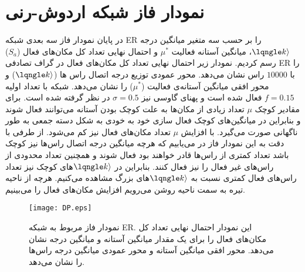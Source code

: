 \section{نمودار فاز شبکه اردوش-رنی}
در پایان نمودار فاز  سه بعدی شبکه ER  را بر حسب سه متغیر میانگین درجه $\lqngle k \rangle$، میانگین آستانه فعالیت  $\mu^*$ و احتمال نهایی تعداد کل مکان‌های فعال ($S_{a}$) رسم کردیم. نمودار زیر احتمال  نهایی تعداد کل مکان‌های فعال در گراف تصادفی ER را با $10000$ راس نشان می‌دهد. محور عمودی توزیع  درجه اتصال‌ راس ها ($\lqngle k \rangle$) و محور افقی میانگین آستانه‌ی فعالیت  ($\mu^*$) را نشان می‌دهد. شبکه با تعداد اولیه $f = 0.15$ فعال شده است و پهنای گاوسی نیز $\sigma = 0.5$ در نظر گرفته شده است. برای مقادیر کوچک $\mu$ تعداد زیادی از مکان‌ها به علت کوچک بودن آستانه می‌توانند فعال شوند و بنابراین در میانگین‌های کوچک فعال سازی خود به خودی به شکل دسته جمعی به طور ناگهانی صورت می‌گیرد. با افزایش $\mu$  تعداد مکان‌های فعال نیز کم می‌شود. از طرفی با دقت به این نمودار فاز در می‌یابیم که هرچه میانگین درجه اتصال راس‌ها نیز کوچک باشد تعداد کمتری از راس‌ها قادر خواهند بود فعال شوند و همچنین تعداد محدودی از راس‌های غیر فعال را نیز فعال کنند. بنابراین در $\lqngle k \rangle$های کوچک نیز تعداد راس‌های فعال کمتری نسبت به $\lqngle k \rangle$های بزرگ مشاهده می‌کنیم. هرچه از ناحیه تیره به سمت ناحیه روشن می‌رویم افزایش مکان‌های فعال را می‌بینیم. 
\begin{figure}[htbp]
\hspace*{0cm}
\centering
\texttt{[image: DP.eps]}
\caption [نمودار فاز مربوط به شبکه ER]{\footnotesize 
نمودار فاز مربوط به شبکه ER. این نمودار احتمال نهایی تعداد کل مکان‌های فعال را برای یک مقدار میانگین آستانه و میانگین درجه نشان می‌دهد. محور افقی میانگین آستانه و محور عمودی میانگین درجه راس‌ها را نشان می‌دهد.}
\label{fig:DP}
\end{figure}

